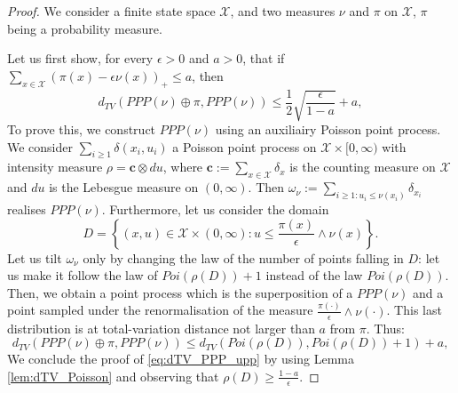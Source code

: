 \documentclass[12pt,a4paper]{article}
\newcommand{\1}[1]{{\mathbf 1}{\{#1\}}}
\newcommand{\8}{{\infty}}
\begin{document}
\begin{proof}
  We consider a finite state space $\mathcal{X}$, and two measures $\nu$ and $\pi$ on $\mathcal{X}$, $\pi$ being a probability measure. 

  Let us first show, for every  $\epsilon>0$ and $a>0$, that if $\sum_{x\in \mathcal{X}} 
  \left(\pi(x)-\epsilon \nu(x)\right)_+  \le a$, then  
\begin{equation}\label{eq:dTV_PPP_upp}
  d_{TV}( PPP(\nu) \oplus \pi, PPP(\nu)) \le \frac{1}{2}\sqrt{\frac{\epsilon}{1-a}} + a ,
\end{equation}
To prove this, we construct $PPP(\nu)$ using an auxiliairy Poisson point process. We consider $\sum_{i\ge 1} \delta{(x_i, u_i)}$ a Poisson point process on $\mathcal{X} \times [0, \infty)$ with intensity measure $\rho=\mathbf{c} \otimes du$, where $\mathbf{c}:=\sum_{x\in \mathcal{X}} \delta_x$ is the counting measure on $\mathcal{X}$ and $du$ is the Lebesgue measure on $(0, \infty)$. 
Then 
$\omega_\nu:=\sum_{i\ge 1: u_i\le \nu(x_i)} \delta_{x_i}$ 
realises $PPP(\nu)$. 
Furthermore, let us consider the domain
$$D=\left\{(x,u)\in \mathcal{X}\times (0, \infty): u\le \frac{\pi(x)}{\epsilon} \wedge \nu(x)\right\}.$$
Let us tilt $\omega_\nu$ only by changing the law of the number of points falling in $D$: let us make it follow the law of $Poi(\rho(D))+1$ instead of the law $Poi(\rho(D))$. 
Then, we obtain a point process which is the superposition of a $PPP(\nu)$ and a point sampled under the renormalisation of the measure $\frac{\pi(\cdot)}{\epsilon} \wedge \nu(\cdot)$. This last distribution is at total-variation distance not larger than $a$ from $\pi$.
Thus:
\begin{equation}
  d_{TV}( PPP(\nu) \oplus \pi, PPP(\nu)) \le d_{TV}(Poi(\rho(D)), Poi(\rho(D))+1)+ a ,
\end{equation}
We conclude the proof of \eqref{eq:dTV_PPP_upp} by using Lemma \ref{lem:dTV_Poisson} and observing that $\rho(D) \ge \frac{1-a}{\epsilon}$.

\medskip


\end{proof}
\end{document}
